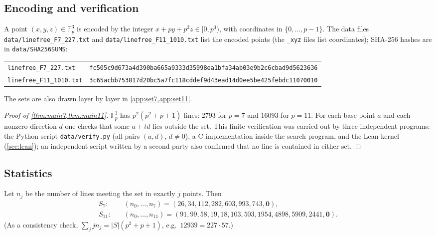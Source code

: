 \documentclass[11pt]{article}
\numberwithin{equation}{section}
\theoremstyle{definition}
\theoremstyle{remark}
\newcommand{\F}{\mathbb F}
\begin{document}
\subsection{Encoding and verification}
A point $(x,y,z)\in\F_p^3$ is encoded by the integer $x+py+p^2z\in[0,p^3)$, with coordinates in
$\{0,\dots,p-1\}$. The data files \texttt{data/linefree\_F7\_227.txt} and
\texttt{data/linefree\_F11\_1010.txt} list the encoded points (the \texttt{\_xyz} files list
coordinates); SHA-256 hashes are in \texttt{data/SHA256SUMS}:
\begin{center}\small
\begin{tabular}{@{}ll@{}}
\texttt{linefree\_F7\_227.txt} & \texttt{fc505c9d673a4d390ba665a9333d35998ea1bfa34ab03e9b2c6cbad9d5623636}\\
\texttt{linefree\_F11\_1010.txt} & \texttt{3c65acbb753817d20bc5a7fc118cddef9d43ead14d0ee5be425febdc11070010}
\end{tabular}
\end{center}
The sets are also drawn layer by layer in \cref{app:set7,app:set11}.

\begin{proof}[Proof of \cref{thm:main7,thm:main11}]
$\F_p^3$ has $p^2(p^2+p+1)$ lines: $2793$ for $p=7$ and $16093$ for $p=11$. For each base point
$a$ and each nonzero direction $d$ one checks that some $a+td$ lies outside the set. This finite
verification was carried out by three independent programs: the Python script
\texttt{data/verify.py} (all pairs $(a,d)$, $d\ne0$), a C implementation inside the search
program, and the Lean kernel (\cref{sec:lean}); an independent script written by a second party
also confirmed that no line is contained in either set.
\end{proof}

\subsection{Statistics}
Let $n_j$ be the number of lines meeting the set in exactly $j$ points. Then
\begin{align*}
S_7:&\quad (n_0,\dots,n_7)=(26,34,112,282,603,993,743,\mathbf 0),\\
S_{11}:&\quad (n_0,\dots,n_{11})=(91,99,58,19,18,103,503,1954,4898,5909,2441,\mathbf 0).
\end{align*}
(As a consistency check, $\sum_j jn_j=|S|(p^2+p+1)$, e.g.\ $12939=227\cdot57$.)
\end{document}
